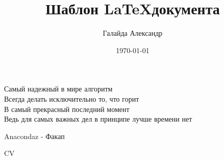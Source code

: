 \documentclass[a4paper,10pt]{article}
\title{Шаблон \LaTeX документа}
\author{Галайда Александр}
\date{\today}
\begin{document}
\maketitle
\epigraph{Самый надежный в мире алгоритм \\
	Всегда делать исключительно то, что горит \\
	В самый прекрасный последний момент \\
	Ведь для самых важных дел в принципе лучше времени нет}{Anacondaz - Факап}
\tableofcontents

\gls{CV}
\clearpage
\printglossaries
\printbibliography
\end{document}
